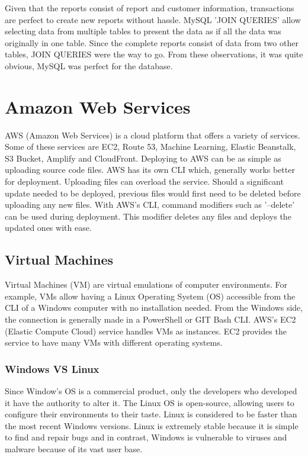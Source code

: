 Given that the reports consist of report and customer information, transactions are perfect to create new reports without hassle. MySQL 'JOIN QUERIES' allow selecting data from multiple tables to present the data as if all the data was originally in one table. Since the complete reports consist of data from two other tables, JOIN QUERIES were the way to go. From these observations, it was quite obvious, MySQL was perfect for the database. 

\section{Amazon Web Services}
AWS (Amazon Web Services) is a cloud platform that offers a variety of services. Some of these services are EC2, Route 53, Machine Learning, Elastic Beanstalk, S3 Bucket, Amplify and CloudFront. Deploying to AWS can be as simple as uploading source code files. AWS has its own CLI which, generally works better for deployment. Uploading files can overload the service. Should a significant update needed to be deployed, previous files would first need to be deleted before uploading any new files. With AWS's CLI, command modifiers such as '--delete' can be used during deployment. This modifier deletes any files and deploys the updated ones with ease.

\subsection{Virtual Machines}
Virtual Machines (VM) are virtual emulations of computer environments. \cite{ref20} For example, VMs allow having a Linux Operating System (OS) accessible from the CLI of a Windows computer with no installation needed. From the Windows side, the connection is generally made in a PowerShell or GIT Bash CLI. AWS's EC2 (Elastic Compute Cloud) service handles VMs as instances. EC2 provides the service to have many VMs with different operating systems.

\subsubsection{Windows VS Linux}
Since Window's OS is a commercial product, only the developers who developed it have the authority to alter it. The Linux OS is open-source, allowing users to configure their environments to their taste. Linux is considered to be faster than the most recent Windows versions. Linux is extremely stable because it is simple to find and repair bugs and in contrast, Windows is vulnerable to viruses and malware because of its vast user base. \cite{ref21}

